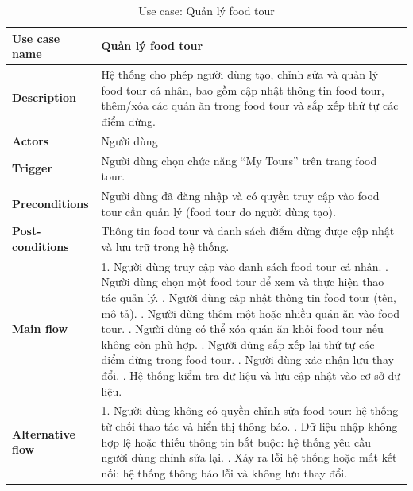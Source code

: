 \begingroup
\renewcommand{\arraystretch}{1.25}
\begin{longtable}{|p{4cm}|p{10cm}|}
\caption{Use case: Quản lý food tour} \\
\endfirsthead

\endhead

\endfoot

\endlastfoot

\hline

\textbf{Use case name} &
Quản lý food tour \\
\hline

\textbf{Description} &
Hệ thống cho phép người dùng tạo, chỉnh sửa và quản lý food tour cá nhân, bao gồm cập nhật thông tin food tour, thêm/xóa các quán ăn trong food tour và sắp xếp thứ tự các điểm dừng. \\
\hline

\textbf{Actors} &
Người dùng \\
\hline

\textbf{Trigger} &
Người dùng chọn chức năng ``My Tours'' trên trang food tour. \\
\hline

\textbf{Preconditions} &
Người dùng đã đăng nhập và có quyền truy cập vào food tour cần quản lý (food tour do người dùng tạo). \\
\hline

\textbf{Post-conditions} &
Thông tin food tour và danh sách điểm dừng được cập nhật và lưu trữ trong hệ thống. \\
\hline

\textbf{Main flow} &
1. Người dùng truy cập vào danh sách food tour cá nhân. \newline 2. Người dùng chọn một food tour để xem và thực hiện thao tác quản lý. \newline 3. Người dùng cập nhật thông tin food tour (tên, mô tả). \newline 4. Người dùng thêm một hoặc nhiều quán ăn vào food tour. \newline 5. Người dùng có thể xóa quán ăn khỏi food tour nếu không còn phù hợp. \newline 6. Người dùng sắp xếp lại thứ tự các điểm dừng trong food tour. \newline 7. Người dùng xác nhận lưu thay đổi. \newline 8. Hệ thống kiểm tra dữ liệu và lưu cập nhật vào cơ sở dữ liệu. \\
\hline

\textbf{Alternative flow} &
1. Người dùng không có quyền chỉnh sửa food tour: hệ thống từ chối thao tác và hiển thị thông báo. \newline 2. Dữ liệu nhập không hợp lệ hoặc thiếu thông tin bắt buộc: hệ thống yêu cầu người dùng chỉnh sửa lại. \newline 3. Xảy ra lỗi hệ thống hoặc mất kết nối: hệ thống thông báo lỗi và không lưu thay đổi. \\
\hline


\end{longtable}

